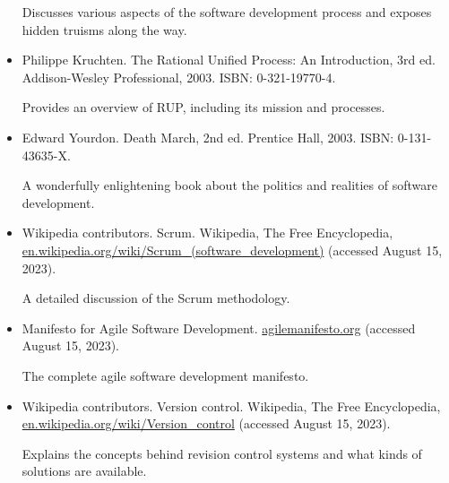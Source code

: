 \begin{itemize}
Discusses various aspects of the software development process and exposes hidden truisms along the way.

\item
Philippe Kruchten. The Rational Unified Process: An Introduction, 3rd ed. Addison-Wesley Professional, 2003. ISBN: 0-321-19770-4.

Provides an overview of RUP, including its mission and processes.

\item
Edward Yourdon. Death March, 2nd ed. Prentice Hall, 2003. ISBN: 0-131-43635-X.

A wonderfully enlightening book about the politics and realities of software development.

\item
Wikipedia contributors. Scrum. Wikipedia, The Free Encyclopedia, \url{en.wikipedia.org/wiki/Scrum_(software_development)} (accessed August 15, 2023).

A detailed discussion of the Scrum methodology.

\item
Manifesto for Agile Software Development. \url{agilemanifesto.org} (accessed August 15, 2023).

The complete agile software development manifesto.

\item
Wikipedia contributors. Version control. Wikipedia, The Free Encyclopedia, \url{en.wikipedia.org/wiki/Version_control} (accessed August 15, 2023).

Explains the concepts behind revision control systems and what kinds of solutions are available.
\end{itemize}